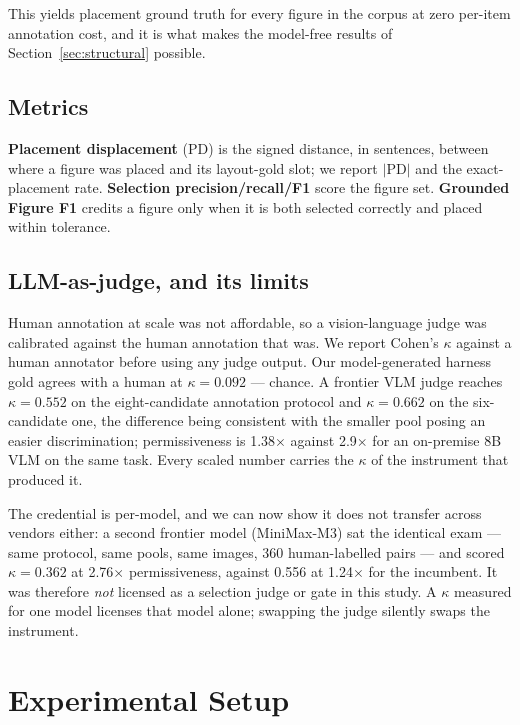 \documentclass[journal]{IEEEtran}
\begin{document}
This yields placement ground truth for every figure in the corpus at zero
per-item annotation cost, and it is what makes the model-free results of
Section~\ref{sec:structural} possible.

\subsection{Metrics}

\textbf{Placement displacement} (PD) is the signed distance, in sentences, between
where a figure was placed and its layout-gold slot; we report $|\mathrm{PD}|$ and
the exact-placement rate. \textbf{Selection precision/recall/F1} score the figure
set. \textbf{Grounded Figure F1} credits a figure only when it is both selected
correctly and placed within tolerance.

\subsection{LLM-as-judge, and its limits}

Human annotation at scale was not affordable, so a vision-language judge was
calibrated against the human annotation that was. We report Cohen's $\kappa$
against a human annotator before using any judge output. Our model-generated
harness gold agrees with a human at $\kappa = 0.092$ --- chance. A frontier VLM
judge reaches $\kappa = 0.552$ on the eight-candidate annotation protocol and
$\kappa = 0.662$ on the six-candidate one, the difference being consistent with
the smaller pool posing an easier discrimination; permissiveness is 1.38$\times$
against 2.9$\times$ for an on-premise 8B VLM on the same task. Every scaled number
carries the $\kappa$ of the instrument that produced it.

The credential is per-model, and we can now show it does not transfer across
vendors either: a second frontier model (MiniMax-M3) sat the identical exam
--- same protocol, same pools, same images, 360 human-labelled pairs --- and
scored $\kappa = 0.362$ at 2.76$\times$ permissiveness, against 0.556 at
1.24$\times$ for the incumbent. It was therefore \emph{not} licensed as a
selection judge or gate in this study. A $\kappa$ measured for one model
licenses that model alone; swapping the judge silently swaps the instrument.

\section{Experimental Setup}
\end{document}
